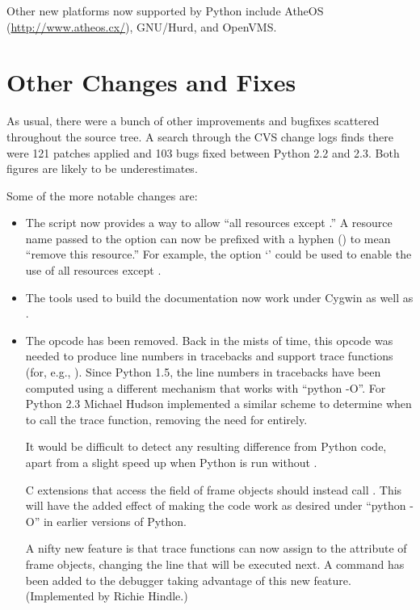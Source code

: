 \documentclass{howto}
\begin{document}
Other new platforms now supported by Python include AtheOS
(\url{http://www.atheos.cx/}), GNU/Hurd, and OpenVMS.


\section{Other Changes and Fixes \label{section-other}}

As usual, there were a bunch of other improvements and bugfixes
scattered throughout the source tree.  A search through the CVS change
logs finds there were 121 patches applied and 103 bugs fixed between
Python 2.2 and 2.3.  Both figures are likely to be underestimates.

Some of the more notable changes are:

\begin{itemize}

\item The  script now provides a way to allow ``all
resources except .''  A resource name passed to the
 option can now be prefixed with a hyphen
(\character{-}) to mean ``remove this resource.''  For example, the
option `' could be used to enable the
use of all resources except .

\item The tools used to build the documentation now work under Cygwin
as well as \UNIX.

\item The  opcode has been removed.  Back in the
mists of time, this opcode was needed to produce line numbers in
tracebacks and support trace functions (for, e.g., ).
Since Python 1.5, the line numbers in tracebacks have been computed
using a different mechanism that works with ``python -O''.  For Python
2.3 Michael Hudson implemented a similar scheme to determine when to
call the trace function, removing the need for 
entirely.

It would be difficult to detect any resulting difference from Python
code, apart from a slight speed up when Python is run without
.

C extensions that access the  field of frame objects
should instead call .
This will have the added effect of making the code work as desired
under ``python -O'' in earlier versions of Python.

A nifty new feature is that trace functions can now assign to the
 attribute of frame objects, changing the line that
will be executed next.  A  command has been added to the
 debugger taking advantage of this new feature.
(Implemented by Richie Hindle.)

\end{itemize}
\end{document}
